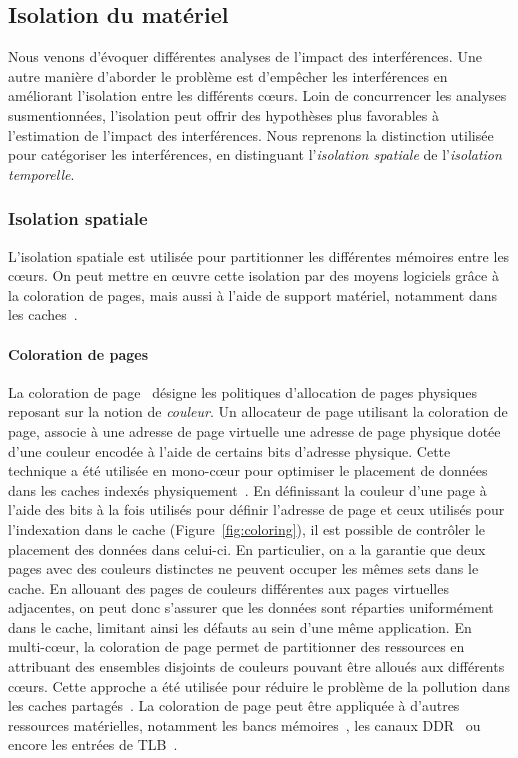 \subsection{Isolation du matériel}

Nous venons d'évoquer différentes analyses de l'impact des interférences.
Une autre manière d'aborder le problème est d'empêcher les interférences en améliorant l'isolation entre les différents cœurs.
Loin de concurrencer les analyses susmentionnées, l'isolation peut offrir des hypothèses plus favorables à l'estimation de l'impact des interférences.
Nous reprenons la distinction utilisée pour catégoriser les interférences, en distinguant l'\emph{isolation spatiale} de l'\emph{isolation temporelle}.

\subsubsection{Isolation spatiale}

L'isolation spatiale est utilisée pour partitionner les différentes mémoires entre les cœurs.
On peut mettre en œuvre cette isolation par des moyens logiciels grâce à la coloration de pages, mais aussi à l'aide de support matériel, notamment dans les caches~\cite{lockdown}.

\paragraph{Coloration de pages}

La coloration de page~\cite{taylor1990tlb} désigne les politiques d'allocation de pages physiques reposant sur la notion de \emph{couleur}.
Un allocateur de page utilisant la coloration de page, associe à une adresse de page virtuelle une adresse de page physique dotée d'une couleur encodée à l'aide de certains bits d'adresse physique.
Cette technique a été utilisée en mono-cœur pour optimiser le placement de données dans les caches indexés physiquement~\cite{kessler1992page,romer1994dynamic,sherwood1999reducing,1996_bugnion_Compiler_directed_page_coloring_for_multiprocessors}.
En définissant la couleur d'une page à l'aide des bits à la fois utilisés pour définir l'adresse de page et ceux utilisés pour l'indexation dans le cache (Figure~\ref{fig:coloring}), il est possible de contrôler le placement des données dans celui-ci.
En particulier, on a la garantie que deux pages avec des couleurs distinctes ne peuvent occuper les mêmes sets dans le cache.
En allouant des pages de couleurs différentes aux pages virtuelles adjacentes, on peut donc s'assurer que les données sont réparties uniformément dans le cache, limitant ainsi les défauts au sein d'une même application.
En multi-cœur, la coloration de page permet de partitionner des ressources en attribuant des ensembles disjoints de couleurs pouvant être alloués aux différents cœurs.
Cette approche a été utilisée pour réduire le problème de la pollution dans les caches partagés~\cite{soares2008reducing}.
La coloration de page peut être appliquée à d'autres ressources matérielles, notamment les bancs mémoires~\cite{yun2014palloc}, les canaux DDR~\cite{muralidhara_reducing_2011} ou encore les entrées de TLB~\cite{panchamukhi_providing_2015}.

